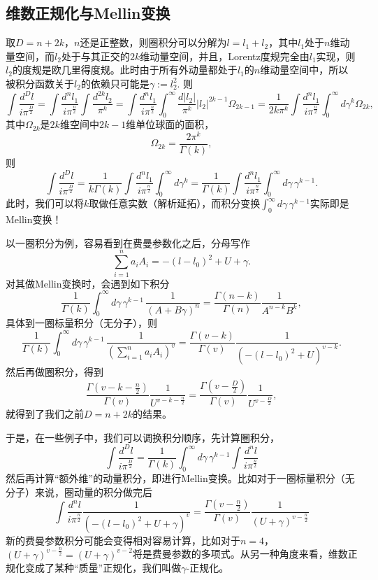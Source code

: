 \documentclass[12pt]{article}
\theoremstyle{definition}
\theoremstyle{plain}
\begin{document}
\subsection{维数正规化与Mellin变换}

取$D=n+2k$，$n$还是正整数，则圈积分可以分解为$l=l_1+l_2$，其中$l_1$处于$n$维动量空间，而$l_2$处于与其正交的$2k$维动量空间，并且，Lorentz度规完全由$l_1$实现，则$l_2$的度规是欧几里得度规。此时由于所有外动量都处于$l_1$的$n$维动量空间中，所以被积分函数关于$l_2$的依赖只可能是$\gamma:=l_2^2$. 则
\[
	\int \frac{d^{D} l}{i \pi^{\frac{D}{2}}}=\int \frac{d^{n} l_1}{i \pi^{\frac{n}{2}}}\int \frac{d^{2k} l_2}{\pi^{k}}=\int \frac{d^{n} l_1}{i \pi^{\frac{n}{2}}}\int_0^\infty \frac{d |l_2|}{\pi^{k}} |l_2|^{2k-1} \Omega_{2k-1}=\frac{1}{2k \pi^k}\int \frac{d^{n} l_1}{i \pi^{\frac{n}{2}}}\int_0^\infty d\gamma^k \Omega_{2k},
\]
其中$\Omega_{2k}$是$2k$维空间中$2k-1$维单位球面的面积，
\[
	\Omega_{2k}=\frac{2\pi^k}{\Gamma(k)},
\]
则
\[
	\int \frac{d^{D} l}{i \pi^{\frac{D}{2}}}=\frac{1}{k\Gamma(k)}\int \frac{d^{n} l_1}{i \pi^{\frac{n}{2}}}\int_0^\infty d\gamma^k=\frac{1}{\Gamma(k)}\int \frac{d^{n} l_1}{i \pi^{\frac{n}{2}}}\int_0^\infty d\gamma\, \gamma^{k-1}.
\]
此时，我们可以将$k$取做任意实数（解析延拓），而积分变换$\int_0^\infty d\gamma\, \gamma^{k-1}$实际即是Mellin变换！

以一圈积分为例，容易看到在费曼参数化之后，分母写作
\[
	\sum_{i=1}^n a_iA_i= -(l-l_0)^2+U+\gamma.
\]
对其做Mellin变换时，会遇到如下积分
\[
	\frac{1}{\Gamma(k)}\int_0^\infty d\gamma \, \gamma^{k-1}\, \frac{1}{(A+B\gamma)^n}=\frac{\Gamma(n-k)}{\Gamma(n)}\frac{1}{A^{n-k}B^k},
\]
具体到一圈标量积分（无分子），则
\[
	\frac{1}{\Gamma(k)}\int_0^\infty d\gamma \, \gamma^{k-1}\, \frac{1}{(\sum_{i=1}^n a_iA_i)^v}=\frac{\Gamma(v-k)}{\Gamma(v)}\frac{1}{(-(l-l_0)^2+U)^{v-k}}.
\]
然后再做圈积分，得到
\[
	\frac{\Gamma\left(v-k-\frac{n}{2}\right)}{\Gamma(v)}\frac{1}{U^{v-k-\frac{n}{2}}}=\frac{\Gamma\left(v-\frac{D}{2}\right)}{\Gamma(v)} \frac{1}{U^{v-\frac{D}{2}}},
\]
就得到了我们之前$D=n+2k$的结果。

于是，在一些例子中，我们可以调换积分顺序，先计算圈积分，
\[
	\int \frac{d^{D} l}{i \pi^{\frac{D}{2}}}=\frac{1}{\Gamma(k)}\int_0^\infty d\gamma\, \gamma^{k-1}\int \frac{d^{n} l}{i \pi^{\frac{n}{2}}}
\]
然后再计算“额外维”的动量积分，即进行Mellin变换。比如对于一圈标量积分（无分子）来说，圈动量的积分做完后
\[
	\int \frac{d^{n} l}{i \pi^{\frac{n}{2}}} \frac{1}{(-(l-l_0)^2+U+\gamma)^v}
	=\frac{\Gamma\left(v-\frac{n}{2}\right)}{\Gamma(v)} \frac{1}{(U+\gamma)^{v-\frac{n}{2}}}
\]
新的费曼参数积分可能会变得相对容易计算，比如对于$n=4$，$(U+\gamma)^{v-\frac{n}{2}}=(U+\gamma)^{v-2}$将是费曼参数的多项式。从另一种角度来看，维数正规化变成了某种“质量”正规化，我们叫做$\gamma$-正规化。
\end{document}
